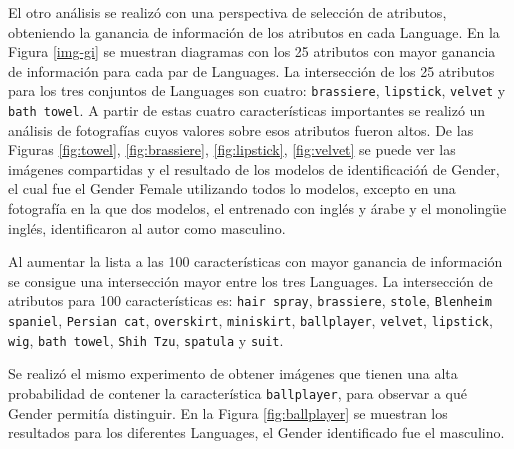 \documentclass[runningheads]{llncs}
\begin{document}
El otro análisis se realizó con una perspectiva 
de selección de atributos, obteniendo la ganancia de información 
de los atributos en cada Language. En la Figura \ref{img-gi} se muestran
diagramas con los 25 atributos con mayor ganancia de información para cada par de 
Languages. La intersección de los 25 atributos para los tres conjuntos de Languages 
son cuatro: \texttt{brassiere}, \texttt{lipstick}, \texttt{velvet} y 
\texttt{bath towel}. A partir de estas cuatro características importantes
se realizó un análisis de fotografías cuyos valores sobre esos atributos
fueron altos. De las Figuras \ref{fig:towel}, \ref{fig:brassiere}, 
\ref{fig:lipstick}, \ref{fig:velvet} se puede ver las imágenes compartidas
y el resultado de los modelos de identificacióń de Gender, el cual fue el Gender
Female utilizando todos lo modelos, excepto en una fotografía en la que dos modelos,
el entrenado con inglés y árabe y el monolingüe inglés, identificaron al autor
como masculino.

Al aumentar la lista a las 100 características con mayor ganancia de información
se consigue una intersección mayor entre los tres Languages. La intersección
de atributos para 100 características es: \texttt{hair spray}, \texttt{brassiere}, \texttt{stole}, \texttt{Blenheim spaniel}, \texttt{Persian cat}, \texttt{overskirt}, \texttt{miniskirt}, \texttt{ballplayer}, \texttt{velvet}, \texttt{lipstick}, \texttt{wig}, \texttt{bath towel}, \texttt{Shih Tzu}, \texttt{spatula} y \texttt{suit}.

Se realizó el mismo experimento de obtener imágenes que tienen una alta 
probabilidad de contener la característica \texttt{ballplayer}, para
observar a qué Gender permitía distinguir. En la Figura \ref{fig:ballplayer}
se muestran los resultados para los diferentes Languages, el Gender identificado
fue el masculino.
\end{document}

